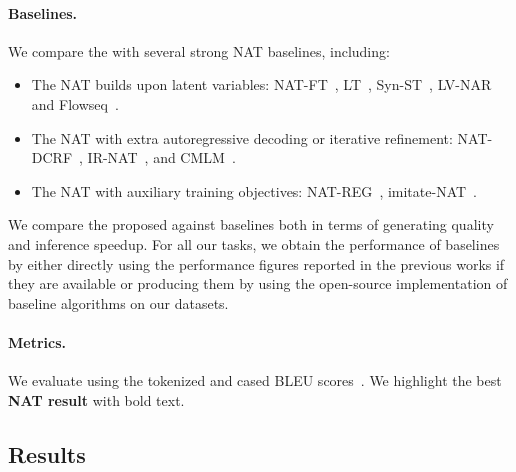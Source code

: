 \paragraph{Baselines.}
We compare the \method with several strong NAT baselines, including:
\begin{itemize}
    \item The NAT builds upon latent variables: NAT-FT~\cite{nat}, LT~\cite{lt}, Syn-ST~\cite{syn_st}, LV-NAR~\cite{lv_nar} and Flowseq~\cite{flowseq}.
    \item The NAT with extra autoregressive decoding or iterative refinement: NAT-DCRF~\cite{nat_crf}, IR-NAT~\cite{iter_nat}, and CMLM~\cite{cmlm}.
    \item The NAT with auxiliary training objectives: NAT-REG~\cite{nat_reg}, imitate-NAT~\cite{imitate_nat}.
\end{itemize}
We compare the proposed \method against baselines both in terms of generating quality and inference speedup. 
For all our tasks, we obtain the performance of baselines by either directly using the performance figures reported in the previous works if they are available or producing them by using the open-source implementation of baseline algorithms on our datasets. 

\paragraph{Metrics.}
We evaluate using the tokenized and cased BLEU scores~\citep{bleu}. 
We highlight the best \textbf{NAT result} with bold text.

\subsection{Results}

